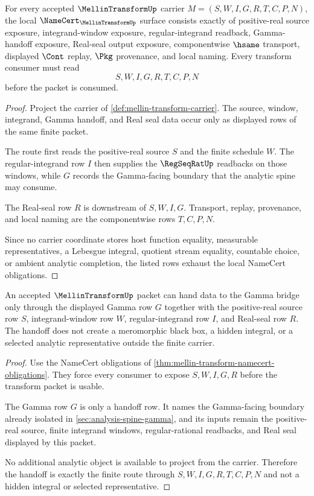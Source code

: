 \begin{theorem}
\label{thm:mellin-transform-namecert-obligations}
For every accepted $\MellinTransformUp$ carrier $M=(S,W,I,G,R,T,C,P,N)$, the local $\NameCert_{\MellinTransformUp}$ surface consists exactly of positive-real source exposure, integrand-window exposure, regular-integrand readback, Gamma-handoff exposure, Real-seal output exposure, componentwise $\hsame$ transport, displayed $\Cont$ replay, $\Pkg$ provenance, and local naming. Every transform consumer must read
$$
S,W,I,G,R,T,C,P,N
$$
before the packet is consumed.
\end{theorem}
\begin{proof}
Project the carrier of \autoref{def:mellin-transform-carrier}. The source, window, integrand, Gamma handoff, and Real seal data occur only as displayed rows of the same finite packet.

The route first reads the positive-real source $S$ and the finite schedule $W$. The regular-integrand row $I$ then supplies the $\RegSeqRatUp$ readbacks on those windows, while $G$ records the Gamma-facing boundary that the analytic spine may consume.

The Real-seal row $R$ is downstream of $S,W,I,G$. Transport, replay, provenance, and local naming are the componentwise rows $T,C,P,N$.

Since no carrier coordinate stores host function equality, measurable representatives, a Lebesgue integral, quotient stream equality, countable choice, or ambient analytic completion, the listed rows exhaust the local NameCert obligations.
\end{proof}

\begin{theorem}
\label{thm:mellin-transform-gamma-handoff}
An accepted $\MellinTransformUp$ packet can hand data to the Gamma bridge only through the displayed Gamma row $G$ together with the positive-real source row $S$, integrand-window row $W$, regular-integrand row $I$, and Real-seal row $R$. The handoff does not create a meromorphic black box, a hidden integral, or a selected analytic representative outside the finite carrier.
\end{theorem}
\begin{proof}
Use the NameCert obligations of \autoref{thm:mellin-transform-namecert-obligations}. They force every consumer to expose $S,W,I,G,R$ before the transform packet is usable.

The Gamma row $G$ is only a handoff row. It names the Gamma-facing boundary already isolated in \autoref{sec:analysis-spine-gamma}, and its inputs remain the positive-real source, finite integrand windows, regular-rational readbacks, and Real seal displayed by this packet.

No additional analytic object is available to project from the carrier. Therefore the handoff is exactly the finite route through $S,W,I,G,R,T,C,P,N$ and not a hidden integral or selected representative.
\end{proof}

